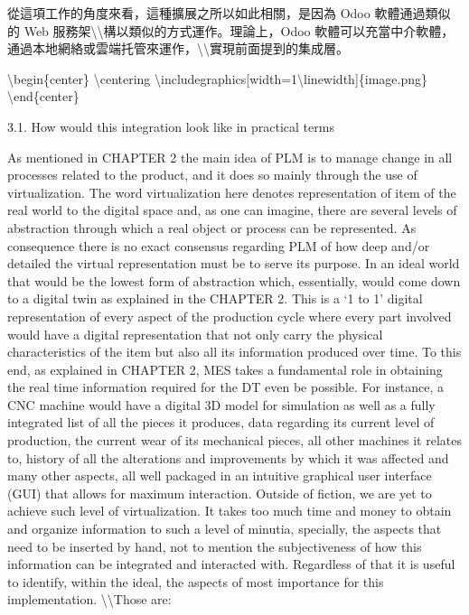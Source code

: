 從這項工作的角度來看，這種擴展之所以如此相關，是因為 Odoo 軟體通過類似的
Web 服務架\textbackslash\textbackslash 構以類似的方式運作。理論上，Odoo
軟體可以充當中介軟體，通過本地網絡或雲端托管來運作，\textbackslash\textbackslash 實現前面提到的集成層。

\textbackslash begin\{center\} \textbackslash centering
\textbackslash includegraphics{[}width=1\textbackslash linewidth{]}\{image.png\}
\textbackslash end\{center\}

3.1. How would this integration look like in practical terms

As mentioned in CHAPTER 2 the main idea of PLM is to manage change in
all processes related to the product, and it does so mainly through the
use of virtualization. The word virtualization here denotes
representation of item of the real world to the digital space and, as
one can imagine, there are several levels of abstraction through which a
real object or process can be represented. As consequence there is no
exact consensus regarding PLM of how deep and/or detailed the virtual
representation must be to serve its purpose. In an ideal world that
would be the lowest form of abstraction which, essentially, would come
down to a digital twin as explained in the CHAPTER 2. This is a `1 to 1'
digital representation of every aspect of the production cycle where
every part involved would have a digital representation that not only
carry the physical characteristics of the item but also all its
information produced over time. To this end, as explained in CHAPTER 2,
MES takes a fundamental role in obtaining the real time information
required for the DT even be possible. For instance, a CNC machine would
have a digital 3D model for simulation as well as a fully integrated
list of all the pieces it produces, data regarding its current level of
production, the current wear of its mechanical pieces, all other
machines it relates to, history of all the alterations and improvements
by which it was affected and many other aspects, all well packaged in an
intuitive graphical user interface (GUI) that allows for maximum
interaction. Outside of fiction, we are yet to achieve such level of
virtualization. It takes too much time and money to obtain and organize
information to such a level of minutia, specially, the aspects that need
to be inserted by hand, not to mention the subjectiveness of how this
information can be integrated and interacted with. Regardless of that it
is useful to identify, within the ideal, the aspects of most importance
for this implementation. \textbackslash\textbackslash Those are:
